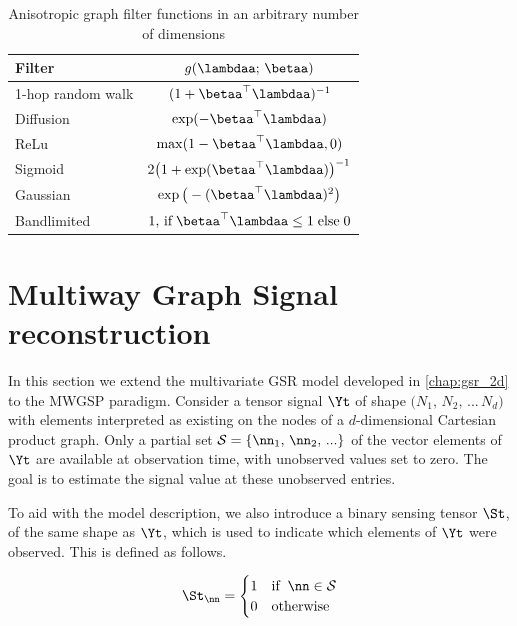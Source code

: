 \begin{table}[t]
    \def\arraystretch{1.8}
    \begin{center}
        \begin{tabular}{lc}
            \toprule
            \textbf{Filter}   & $g(\lambdaa; \,\betaa)$ \\
            \midrule
            1-hop random walk & $(1 + \betaa^\top\lambdaa)^{-1}$\\
            Diffusion         & $\exp(-\betaa^\top\lambdaa)$\\
            ReLu              & $\max (1 - \betaa^\top\lambdaa, 0)$\\
            Sigmoid           & $2 \big( 1 + \exp(\betaa^\top\lambdaa)\big)^{-1}$\\
            Gaussian          & $\exp \big(-(\betaa^\top\lambdaa)^2\big)$\\
            Bandlimited       & $1, \,\text{if} \; \betaa^\top\lambdaa \leq 1 \; \text{else} \; 0$ \\
            \bottomrule
        \end{tabular}
    \end{center}
    \caption{Anisotropic graph filter functions in an arbitrary number of dimensions}
    \label{tab:anis_filters}
\end{table}




\section{Multiway Graph Signal reconstruction}

\label{sec:tensor_gsr}

In this section we extend the multivariate GSR model developed in \cref{chap:gsr_2d} to the MWGSP paradigm. Consider a tensor signal $\Yt$ of shape $\big(N_1, \, N_2, \, ... \, N_d \big)$ with elements interpreted as existing on the nodes of a $d$-dimensional Cartesian product graph. Only a partial set $\mathcal{S} = \{\nn_1, \, \nn_2, \, ... \}$ of the vector elements of $\Yt$ are available at observation time, with unobserved values set to zero. The goal is to estimate the signal value at these unobserved entries. 

To aid with the model description, we also introduce a binary sensing tensor $\St$, of the same shape as $\Yt$, which is used to indicate which elements of $\Yt$ were observed. This is defined as follows.  

\begin{equation}
    \St_{\nn} = \begin{cases}
        1 & \text{if} \;\; \nn \in \mathcal{S} \\
        0 & \text{otherwise}
    \end{cases}
\end{equation}

